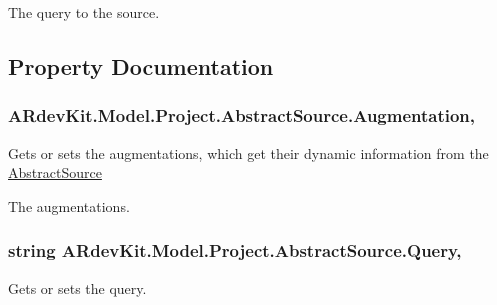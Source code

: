 The query to the source. 



\subsection{Property Documentation}
\hypertarget{class_a_rdev_kit_1_1_model_1_1_project_1_1_abstract_source_a97697e9bd1d99e0c8a35f47a19568016}{
\subsubsection[{Augmentation}]{ A\-Rdev\-Kit.\-Model.\-Project.\-Abstract\-Source.\-Augmentation\hspace{0.3cm}{\ttfamily [get]}, {\ttfamily [set]}}}\label{class_a_rdev_kit_1_1_model_1_1_project_1_1_abstract_source_a97697e9bd1d99e0c8a35f47a19568016}


Gets or sets the augmentations, which get their dynamic information from the \hyperlink{class_a_rdev_kit_1_1_model_1_1_project_1_1_abstract_source}{Abstract\-Source} 

The augmentations. \hypertarget{class_a_rdev_kit_1_1_model_1_1_project_1_1_abstract_source_a77b9039615be2c2792e6f6792f0d32bc}{
\subsubsection[{Query}]{\setlength{\rightskip}{0pt plus 5cm}string A\-Rdev\-Kit.\-Model.\-Project.\-Abstract\-Source.\-Query\hspace{0.3cm}{\ttfamily [get]}, {\ttfamily [set]}}}\label{class_a_rdev_kit_1_1_model_1_1_project_1_1_abstract_source_a77b9039615be2c2792e6f6792f0d32bc}


Gets or sets the query. 

